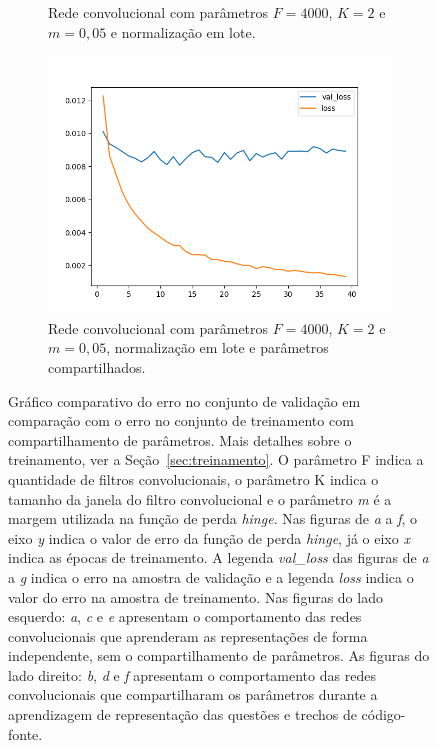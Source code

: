 \begin{figure}[H]
\begin{subfigure}{.5\textwidth}
  \caption{Rede convolucional com parâmetros $F = 4000$, $K = 2$ e $m = 0,05$ e normalização em lote.}
  \label{fig:cnn-4000-k-2-m-005-normalizacao-em-lote-v2}
\end{subfigure}
\begin{subfigure}{.5\textwidth}
  \centering
  \includegraphics[width=.8\linewidth]{figuras/ape-ajustes-hiper-parametros/shared-cnn-with-bn-4000-k-2-m-005.png}
  \caption{Rede convolucional com parâmetros $F = 4000$, $K = 2$ e $m = 0,05$, normalização em lote e parâmetros compartilhados.}
  \label{fig:shared-cnn-4000-k-2-m-005-normalizacao-em-lote}
\end{subfigure}

\caption[Gráfico comparativo do erro no conjunto de validação em comparação com o erro no conjunto de treinamento com compartilhamento de parâmetros.]{Gráfico comparativo do erro no conjunto de validação em comparação com o erro no conjunto de treinamento com compartilhamento de parâmetros. Mais detalhes sobre o treinamento, ver a Seção~\ref{sec:treinamento}. O parâmetro F indica a quantidade de filtros convolucionais, o parâmetro K indica o tamanho da janela do filtro convolucional e o parâmetro \emph{m} é a margem utilizada na função de perda \textit{hinge}. Nas figuras de \emph{a} a \emph{f}, o eixo \emph{y} indica o valor de erro da função de perda \textit{hinge}, já o eixo \emph{x} indica as épocas de treinamento. A legenda \emph{val\_loss} das figuras de \emph{a} a \emph{g} indica o erro na amostra de validação e a legenda \emph{loss} indica o valor do erro na amostra de treinamento. Nas figuras do lado esquerdo: \emph{a}, \emph{c} e \emph{e} apresentam o comportamento das redes convolucionais que aprenderam as representações de forma independente, sem o compartilhamento de parâmetros. As figuras do lado direito: \emph{b}, \emph{d} e \emph{f} apresentam o comportamento das redes convolucionais que compartilharam os parâmetros durante a aprendizagem de representação das questões e trechos de código-fonte. }
\label{fig:treinamento-shared-cnn}
\end{figure}

